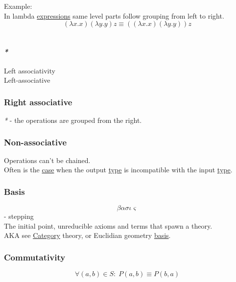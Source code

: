 \documentclass[11pt]{article}
\begin{document}
Example:\\
In lambda \hyperref[org9eb2c72]{expressions} same level parts follow grouping from left to right.\\
$$ (\lambda x . x)(\lambda y . y)z \equiv ((\lambda x . x)(\lambda y . y))z $$\\

\paragraph{\emph{*}}
\label{sec:orgc5a6ec7}

\label{org81cb8f6}Left associativity\\
\label{orge360f3a}Left-associative\\

\subsubsection{\label{orge3a6c38}Right associative}
\label{sec:orgb7abeee}
\emph{*} - the operations are grouped from the right.\\

\subsubsection{\label{org8464337}Non-associative}
\label{sec:orge816140}
Operations can't be chained.\\

Often is the \hyperref[org96bceb0]{case} when the output \hyperref[org4fbaeb8]{type} is incompatible with the input \hyperref[org4fbaeb8]{type}.\\

\subsubsection{\label{org5650c52}Basis}
\label{sec:org6aef774}
$$ \beta\alpha\sigma\iota\varsigma $$ - stepping\\

The initial point, unreducible axioms and terms that spawn a theory.\\
AKA see \hyperref[org3e3a79b]{Category} theory, or Euclidian geometry \hyperref[org5650c52]{basis}.\\

\subsubsection{\label{orgcdabb90}Commutativity}
\label{sec:org9f3ad6e}
$$ \forall (a,b) \in S : \; P(a,b) \equiv P(b,a) $$\\
\end{document}

